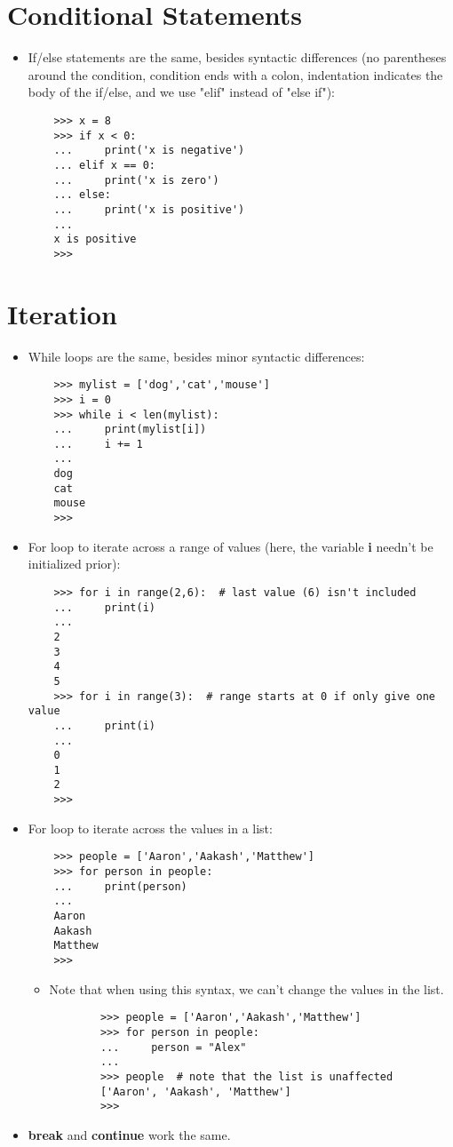 \documentclass{article}
\begin{document}
\section{Conditional Statements}
\begin{itemize}
    \item If/else statements are the same, besides syntactic differences (no parentheses around the condition, condition ends with a colon, indentation indicates the body of the if/else, and we use "elif" instead of "else if"):
    \begin{lstlisting}
    >>> x = 8
    >>> if x < 0:
    ...     print('x is negative')
    ... elif x == 0:
    ...     print('x is zero')
    ... else:
    ...     print('x is positive')
    ... 
    x is positive
    >>> 
    \end{lstlisting}
\end{itemize}

\section{Iteration}
\begin{itemize}
    \item While loops are the same, besides minor syntactic differences:
    \begin{lstlisting}
    >>> mylist = ['dog','cat','mouse']
    >>> i = 0
    >>> while i < len(mylist):
    ...     print(mylist[i])
    ...     i += 1
    ... 
    dog
    cat
    mouse
    >>> 
    \end{lstlisting}
    \item For loop to iterate across a range of values (here, the variable \textbf{i} needn't be initialized prior):
    \begin{lstlisting}
    >>> for i in range(2,6):  # last value (6) isn't included
    ...     print(i)
    ... 
    2
    3
    4
    5
    >>> for i in range(3):  # range starts at 0 if only give one value
    ...     print(i)
    ... 
    0
    1
    2
    >>> 
    \end{lstlisting}
    \item For loop to iterate across the values in a list:
    \begin{lstlisting}
    >>> people = ['Aaron','Aakash','Matthew']
    >>> for person in people:
    ...     print(person)
    ... 
    Aaron
    Aakash
    Matthew
    >>>
    \end{lstlisting}
    \begin{itemize}
        \item Note that when using this syntax, we can't change the values in the list.
        \begin{lstlisting}
        >>> people = ['Aaron','Aakash','Matthew']
        >>> for person in people:
        ...     person = "Alex"
        ... 
        >>> people  # note that the list is unaffected
        ['Aaron', 'Aakash', 'Matthew']
        >>> 
        \end{lstlisting}
    \end{itemize}
    \item \textbf{break} and \textbf{continue} work the same.
\end{itemize}
\end{document}
